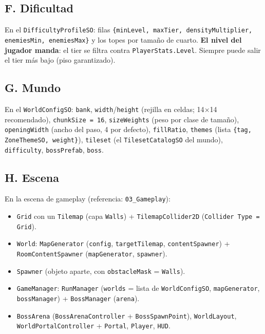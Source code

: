 \documentclass[11pt,a4paper]{article}
\newcommand{\code}[1]{\texttt{#1}}
\begin{document}
\subsection*{F. Dificultad}
En el \code{DifficultyProfileSO}: filas \code{\{minLevel, maxTier, densityMultiplier, enemiesMin, enemiesMax\}}
y los topes por tamaño de cuarto. \textbf{El nivel del jugador manda}: el tier se filtra contra \code{PlayerStats.Level}.
Siempre puede salir el tier más bajo (piso garantizado).

\subsection*{G. Mundo}
En el \code{WorldConfigSO}:
\code{bank}, \code{width}/\code{height} (rejilla en celdas; 14$\times$14 recomendado),
\code{chunkSize = 16}, \code{sizeWeights} (peso por clase de tamaño),
\code{openingWidth} (ancho del paso, 4 por defecto), \code{fillRatio},
\code{themes} (lista \code{\{tag, ZoneThemeSO, weight\}}), \code{tileset} (el \code{TilesetCatalogSO} del mundo),
\code{difficulty}, \code{bossPrefab}, \code{boss}.

\subsection*{H. Escena}
En la escena de gameplay (referencia: \code{03\_Gameplay}):
\begin{itemize}[leftmargin=1.4em]
  \item \code{Grid} con un \code{Tilemap} (capa \code{Walls}) + \code{TilemapCollider2D} (\code{Collider Type = Grid}).
  \item \code{World}: \code{MapGenerator} (\code{config}, \code{targetTilemap}, \code{contentSpawner}) + \code{RoomContentSpawner} (\code{mapGenerator}, \code{spawner}).
  \item \code{Spawner} (objeto aparte, con \code{obstacleMask} = \code{Walls}).
  \item \code{GameManager}: \code{RunManager} (\code{worlds} = lista de \code{WorldConfigSO}, \code{mapGenerator}, \code{bossManager}) + \code{BossManager} (\code{arena}).
  \item \code{BossArena} (\code{BossArenaController} + \code{BossSpawnPoint}), \code{WorldLayout}, \code{WorldPortalController} + \code{Portal}, \code{Player}, \code{HUD}.
\end{itemize}
\end{document}
